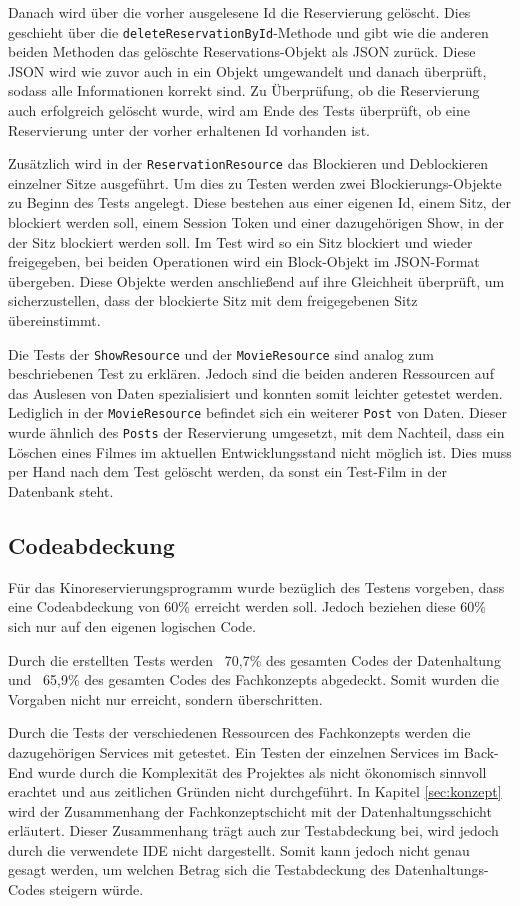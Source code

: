 Danach wird über die vorher ausgelesene Id die Reservierung gelöscht. Dies geschieht über die \texttt{deleteReservationById}-Methode und gibt wie die anderen beiden Methoden das gelöschte Reservations-Objekt als \acs{JSON} zurück.
Diese \acs{JSON} wird wie zuvor auch in ein Objekt umgewandelt und danach überprüft, sodass alle Informationen korrekt sind.
Zu Überprüfung, ob die Reservierung auch erfolgreich gelöscht wurde, wird am Ende des Tests überprüft, ob eine Reservierung unter der vorher erhaltenen Id vorhanden ist.

Zusätzlich wird in der \texttt{ReservationResource} das Blockieren und Deblockieren einzelner Sitze ausgeführt. Um dies zu Testen werden zwei Blockierungs-Objekte zu Beginn des Tests angelegt.
Diese bestehen aus einer eigenen Id, einem Sitz, der blockiert werden soll, einem Session Token und einer dazugehörigen Show, in der der Sitz blockiert werden soll.
Im Test wird so ein Sitz blockiert und wieder freigegeben, bei beiden Operationen wird ein Block-Objekt im \acs{JSON}-Format übergeben.
Diese Objekte werden anschließend auf ihre Gleichheit überprüft, um sicherzustellen, dass der blockierte Sitz mit dem freigegebenen Sitz übereinstimmt.

Die Tests der \texttt{ShowResource} und der \texttt{MovieResource} sind analog zum beschriebenen Test zu erklären.
Jedoch sind die beiden anderen Ressourcen auf das Auslesen von Daten spezialisiert und konnten somit leichter getestet werden.
Lediglich in der \texttt{MovieResource} befindet sich ein weiterer \texttt{Post} von Daten.
Dieser wurde ähnlich des \texttt{Posts} der Reservierung umgesetzt, mit dem Nachteil, dass ein Löschen eines Filmes im aktuellen Entwicklungsstand nicht möglich ist.
Dies muss per Hand nach dem Test gelöscht werden, da sonst ein Test-Film in der Datenbank steht.

\subsection{Codeabdeckung} 
\label{sec:codeabdeckung}
Für das Kinoreservierungsprogramm wurde bezüglich des Testens vorgeben, dass eine Codeabdeckung von 60\% erreicht werden soll.
Jedoch beziehen diese 60\% sich nur auf den eigenen logischen Code.

Durch die erstellten Tests werden ~70,7\% des gesamten Codes der Datenhaltung und ~65,9\% des gesamten Codes des Fachkonzepts abgedeckt.
Somit wurden die Vorgaben nicht nur erreicht, sondern überschritten.

Durch die Tests der verschiedenen Ressourcen des Fachkonzepts werden die dazugehörigen Services mit getestet.
Ein Testen der einzelnen Services im Back-End wurde durch die Komplexität des Projektes als nicht ökonomisch sinnvoll erachtet und aus zeitlichen Gründen nicht durchgeführt.
In Kapitel \vref{sec:konzept} wird der Zusammenhang der Fachkonzeptschicht mit der Datenhaltungsschicht erläutert.
Dieser Zusammenhang trägt auch zur Testabdeckung bei, wird jedoch durch die verwendete \acs{IDE} nicht dargestellt.
Somit kann jedoch nicht genau gesagt werden, um welchen Betrag sich die Testabdeckung des Datenhaltungs-Codes steigern würde.

